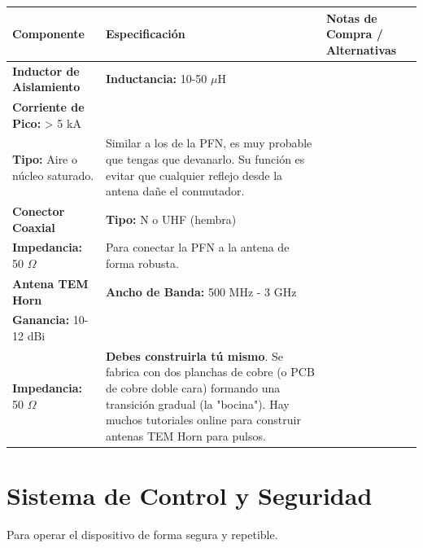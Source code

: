 \documentclass[11pt, a4paper]{article}
\begin{document}
\begin{longtable}{|p{3.5cm}|p{4.5cm}|p{6cm}|}
\hline
\rowcolor[gray]{0.9}
\textbf{Componente} & \textbf{Especificación} & \textbf{Notas de Compra / Alternativas} \\
\hline
\endhead

\textbf{Inductor de Aislamiento} & 
\textbf{Inductancia:} 10-50 $\mu$H \\
\textbf{Corriente de Pico:} > 5 kA \\
\textbf{Tipo:} Aire o núcleo saturado. & 
Similar a los de la PFN, es muy probable que tengas que devanarlo. Su función es evitar que cualquier reflejo desde la antena dañe el conmutador. \\
\hline

\textbf{Conector Coaxial} & 
\textbf{Tipo:} N o UHF (hembra) \\
\textbf{Impedancia:} 50 $\Omega$ & 
Para conectar la PFN a la antena de forma robusta. \\
\hline

\textbf{Antena TEM Horn} & 
\textbf{Ancho de Banda:} 500 MHz - 3 GHz \\
\textbf{Ganancia:} 10-12 dBi \\
\textbf{Impedancia:} 50 $\Omega$ & 
\textbf{Debes construirla tú mismo}. Se fabrica con dos planchas de cobre (o PCB de cobre doble cara) formando una transición gradual (la "bocina"). Hay muchos tutoriales online para construir antenas TEM Horn para pulsos. \\
\hline

\end{longtable}

\newpage
\section{Sistema de Control y Seguridad}

Para operar el dispositivo de forma segura y repetible.
\end{document}
